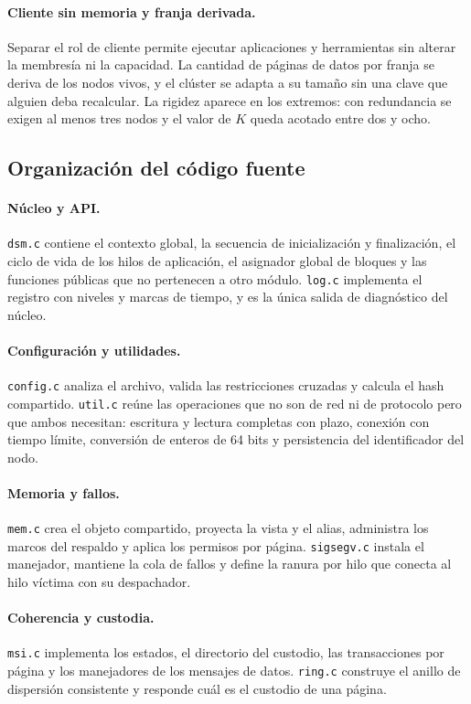 \paragraph{Cliente sin memoria y franja derivada.} Separar el rol de cliente permite ejecutar aplicaciones y herramientas sin alterar la membresía ni la capacidad. La cantidad de páginas de datos por franja se deriva de los nodos vivos, y el clúster se adapta a su tamaño sin una clave que alguien deba recalcular. La rigidez aparece en los extremos: con redundancia se exigen al menos tres nodos y el valor de $K$ queda acotado entre dos y ocho.

\subsection{Organización del código fuente}

\paragraph{Núcleo y API.} \texttt{dsm.c} contiene el contexto global, la secuencia de inicialización y finalización, el ciclo de vida de los hilos de aplicación, el asignador global de bloques y las funciones públicas que no pertenecen a otro módulo. \texttt{log.c} implementa el registro con niveles y marcas de tiempo, y es la única salida de diagnóstico del núcleo.

\paragraph{Configuración y utilidades.} \texttt{config.c} analiza el archivo, valida las restricciones cruzadas y calcula el hash compartido. \texttt{util.c} reúne las operaciones que no son de red ni de protocolo pero que ambos necesitan: escritura y lectura completas con plazo, conexión con tiempo límite, conversión de enteros de 64 bits y persistencia del identificador del nodo.

\paragraph{Memoria y fallos.} \texttt{mem.c} crea el objeto compartido, proyecta la vista y el alias, administra los marcos del respaldo y aplica los permisos por página. \texttt{sigsegv.c} instala el manejador, mantiene la cola de fallos y define la ranura por hilo que conecta al hilo víctima con su despachador.

\paragraph{Coherencia y custodia.} \texttt{msi.c} implementa los estados, el directorio del custodio, las transacciones por página y los manejadores de los mensajes de datos. \texttt{ring.c} construye el anillo de dispersión consistente y responde cuál es el custodio de una página.


